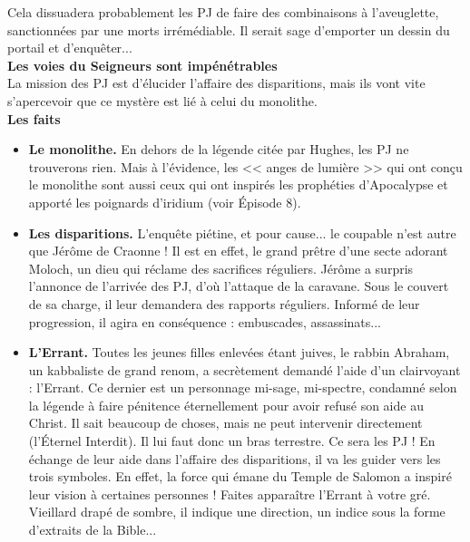 \documentclass[11pt,twoside,a4paper]{book}
\begin{document}
Cela dissuadera probablement les PJ de faire des combinaisons {\`a} l'aveuglette, sanctionn{\'e}es par une morts irr{\'e}m{\'e}diable. Il serait sage d'emporter un dessin du portail et d'enqu{\^e}ter...~\\

\textbf{\large Les voies du Seigneurs sont imp{\'e}n{\'e}trables}~\\

La mission des PJ est d'{\'e}lucider l'affaire des disparitions, mais ils vont vite s'apercevoir que ce myst{\`e}re est li{\'e} {\`a} celui du monolithe.~\\

\textbf{Les faits}~\\

\setlength\parindent{20pt}
\begin{itemize}
	\item \textbf{Le monolithe. }En dehors de la l{\'e}gende cit{\'e}e par Hughes, les PJ ne trouverons rien. Mais {\`a} l'{\'e}vidence, les << anges de lumi{\`e}re >> qui ont con\c{c}u le monolithe sont aussi ceux qui ont inspir{\'e}s les proph{\'e}ties d'Apocalypse et apport{\'e} les poignards d'iridium (voir {\'E}pisode 8).
	\item \textbf{Les disparitions. }L'enqu{\^e}te pi{\'e}tine, et pour cause... le coupable n'est autre que J{\'e}r{\^o}me de Craonne ! Il est en effet, le grand pr{\^e}tre d'une secte adorant Moloch, un dieu qui r{\'e}clame des sacrifices r{\'e}guliers. J{\'e}r{\^o}me a surpris l'annonce de l'arriv{\'e}e des PJ, d'o{\`u} l'attaque de la caravane. Sous le couvert de sa charge, il leur demandera des rapports r{\'e}guliers. Inform{\'e} de leur progression, il agira en cons{\'e}quence : embuscades, assassinats...
	\item \textbf{L'Errant. }Toutes les jeunes filles enlev{\'e}es {\'e}tant juives, le rabbin Abraham, un kabbaliste de grand renom, a secr{\`e}tement demand{\'e} l'aide d'un clairvoyant : l'Errant. Ce dernier est un personnage mi-sage, mi-spectre, condamn{\'e} selon la l{\'e}gende {\`a} faire p{\'e}nitence {\'e}ternellement pour avoir refus{\'e} son aide au Christ. Il sait beaucoup de choses, mais ne peut intervenir directement (l'{\'E}ternel Interdit). Il lui faut donc un bras terrestre. Ce sera les PJ ! En {\'e}change de leur aide dans l'affaire des disparitions, il va les guider vers les trois symboles. En effet, la force qui {\'e}mane du Temple de Salomon a inspir{\'e} leur vision {\`a} certaines personnes ! Faites appara{\^i}tre l'Errant {\`a} votre gr{\'e}. Vieillard drap{\'e} de sombre, il indique une direction, un indice sous la forme d'extraits de la Bible...
\end{itemize}~\\
\setlength\parindent{0pt}
\end{document}

